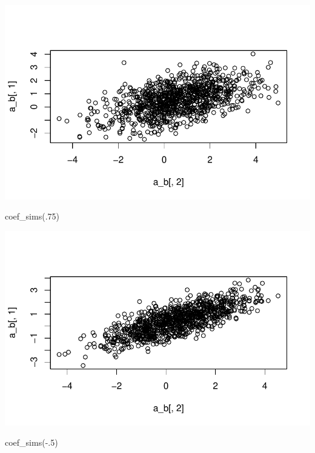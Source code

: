 \documentclass[
  letterpaper,
  DIV=11,
  numbers=noendperiod]{scrartcl}
\newenvironment{Shaded}{\begin{snugshade}}{\end{snugshade}}
\newcommand{\DecValTok}[1]{\textcolor[rgb]{0.68,0.00,0.00}{#1}}
\newcommand{\FunctionTok}[1]{\textcolor[rgb]{0.28,0.35,0.67}{#1}}
\newcommand{\NormalTok}[1]{\textcolor[rgb]{0.00,0.23,0.31}{#1}}
\newcommand{\SpecialCharTok}[1]{\textcolor[rgb]{0.37,0.37,0.37}{#1}}
\begin{document}
\includegraphics{varying_intercepts_varying_slopes_files/figure-pdf/unnamed-chunk-3-2.pdf}

\begin{Shaded}
\begin{Highlighting}[]
\FunctionTok{coef\_sims}\NormalTok{(.}\DecValTok{75}\NormalTok{)}
\end{Highlighting}
\end{Shaded}

\includegraphics{varying_intercepts_varying_slopes_files/figure-pdf/unnamed-chunk-3-3.pdf}

\begin{Shaded}
\begin{Highlighting}[]
\FunctionTok{coef\_sims}\NormalTok{(}\SpecialCharTok{{-}}\NormalTok{.}\DecValTok{5}\NormalTok{)}
\end{Highlighting}
\end{Shaded}
\end{document}
